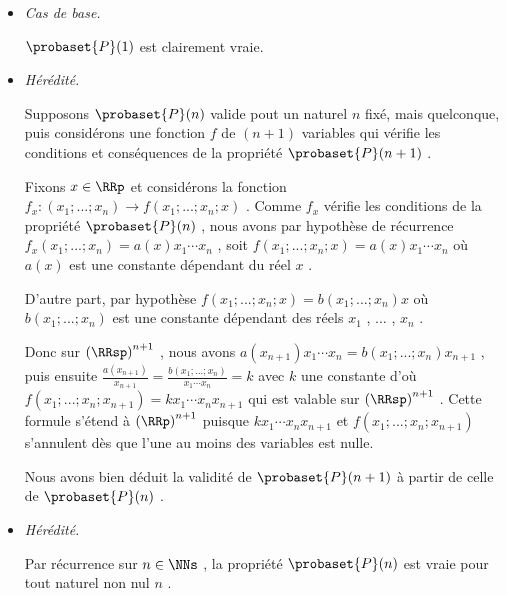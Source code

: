 \begin{itemize}[label=\small\textbullet]
	\item \emph{Cas de base.}
	
	\noindent
	$\probaset{P}(1)$ est clairement vraie.


	\medskip
	\item \emph{Hérédité.}
	
	\noindent
	Supposons $\probaset{P}(n)$ valide pout un naturel $n$ fixé, mais quelconque, puis considérons une fonction $f$ de $(n + 1)$ variables qui vérifie les conditions et conséquences de la propriété $\probaset{P}(n + 1)$ .
	
	\smallskip
	\noindent
	Fixons $x \in \RRp$ et considérons la fonction $f_x : (x_1 ; ... ; x_n) \rightarrow f(x_1 ; ... ; x_n ; x)$ .
	Comme $f_x$  vérifie les conditions de la propriété $\probaset{P}(n)$ ,
	nous avons par hypothèse de récurrence 
	$f_x(x_1 ; ... ; x_n) = a(x) x_1 \cdots x_n$ , soit $f(x_1 ; ... ; x_n ; x) = a(x) x_1 \cdots x_n$ où $a(x)$ est une constante dépendant du réel $x$ .
	
	\smallskip
	\noindent
	D'autre part, par hypothèse $f(x_1 ; ... ; x_n ; x) = b(x_1 ; ... ; x_n) x$ où $b(x_1 ; ... ; x_n)$ est une constante dépendant des réels $x_1$ , ... , $x_n$ .
	
	\smallskip
	\noindent
	Donc sur $\left( \RRsp \right)^{n+1}$ , nous avons
	$a(x_{n+1}) x_1 \cdots x_n = b(x_1 ; ... ; x_n) x_{n+1}$ ,
	puis ensuite
	$\frac{a(x_{n+1})}{x_{n+1}} = \frac{b(x_1 ; ... ; x_n)}{x_1 \cdots x_n} = k$
	avec $k$ une constante d'où
	$f(x_1 ; ... ; x_n ; x_{n+1}) = k x_1 \cdots x_n x_{n+1}$
	qui est valable sur $\left( \RRsp \right)^{n+1}$ .
	Cette formule s'étend à $\left( \RRp \right)^{n+1}$ puisque
	$k x_1 \cdots x_n x_{n+1}$ et $f(x_1 ; ... ; x_n ; x_{n+1})$ s'annulent dès que l'une au moins des variables est nulle.
	
	\smallskip
	\noindent
	Nous avons bien déduit la validité de $\probaset{P}(n+1)$ à partir de celle de $\probaset{P}(n)$ .


	\medskip
	\item \emph{Hérédité.}
	
	\smallskip
	\noindent
	Par récurrence sur $n \in \NNs$ , la propriété $\probaset{P}(n)$ est vraie pour tout naturel non nul $n$ .
\end{itemize} 

